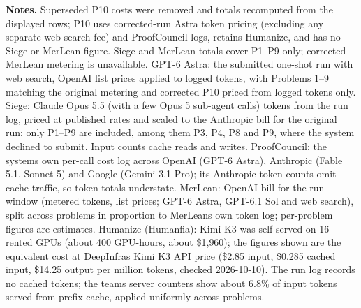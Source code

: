 \begin{table}[ht]
\begin{minipage}{0.95\linewidth}
\textbf{Notes.} Superseded P10 costs were removed and totals recomputed from the displayed rows; P10 uses corrected-run Astra token pricing (excluding any separate web-search fee) and ProofCouncil logs, retains Humanize, and has no Siege or MerLean figure. Siege and MerLean totals cover P1--P9 only; corrected MerLean metering is unavailable. GPT-6 Astra: the submitted one-shot run with web search, OpenAI list prices applied to logged tokens, with Problems 1--9 matching the original metering and corrected P10 priced from logged tokens only. Siege: Claude Opus 5.5 (with a few Opus 5 sub-agent calls) tokens from the run log, priced at published rates and scaled to the Anthropic bill for the original run; only P1--P9 are included, among them P3, P4, P8 and P9, where the system declined to submit. Input counts cache reads and writes. ProofCouncil: the system\textquotesingle s own per-call cost log across OpenAI (GPT-6 Astra), Anthropic (Fable 5.1, Sonnet 5) and Google (Gemini 3.1 Pro); its Anthropic token counts omit cache traffic, so token totals understate. MerLean: OpenAI bill for the run window (metered tokens, list prices; GPT-6 Astra, GPT-6.1 Sol and web search), split across problems in proportion to MerLean\textquotesingle s own token log; per-problem figures are estimates. Humanize (Humanfia): Kimi K3 was self-served on 16 rented GPUs (about 400 GPU-hours, about \$1{,}960); the figures shown are the equivalent cost at DeepInfra\textquotesingle s Kimi K3 API price (\$2.85 input, \$0.285 cached input, \$14.25 output per million tokens, checked 2026-10-10). The run log records no cached tokens; the team\textquotesingle s server counters show about 6.8\% of input tokens served from prefix cache, applied uniformly across problems.
\end{minipage}
\end{table}
